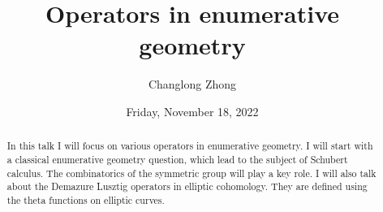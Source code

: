 \documentclass[colloquium]{UAmathtalk}
\author{Changlong Zhong}
\title{Operators in enumerative geometry}
\date{Friday, November 18, 2022}
\begin{document}
\maketitle

\begin{abstract}
In this talk I will focus on various operators in enumerative geometry. I will start with a classical enumerative geometry question, which lead to the subject of Schubert calculus. The combinatorics of the symmetric group will play a key role. I will also talk about the Demazure Lusztig operators in elliptic cohomology. They are defined using the theta functions on elliptic curves.
\end{abstract}
\end{document}
